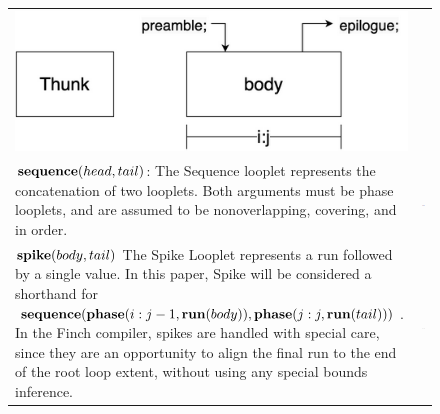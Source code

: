 \begin{figure}[ht]
\begin{tabular} {|l|c|}
    \begin{minipage}[c]{0.35\linewidth}
        \centering
        \includegraphics[scale=0.20]{Looplets-thunk.png}
    \end{minipage} \\
    \begin{minipage}[c]{0.65\linewidth}
        $\text{\textbf{sequence}}(head, tail)$: The Sequence looplet represents the
        concatenation of two looplets. Both arguments must be phase looplets, and
        are assumed to be nonoverlapping, covering, and in order.
    \end{minipage} &
    \begin{minipage}[c]{0.35\linewidth}
        \centering
        \includegraphics[scale=0.20]{Looplets-sequence.png}
    \end{minipage} \\
    \begin{minipage}[c]{0.65\linewidth}
        $\text{\textbf{spike}}(body, tail)$ The Spike Looplet represents a run
        followed by a single value. In this paper, Spike will be considered a
        shorthand for $\text{\textbf{sequence}}(\text{\textbf{phase}}(i:j-1, \text{\textbf{run}}(body)),
        \text{\textbf{phase}}(j:j, \text{\textbf{run}}(tail)))$.  In the Finch compiler, spikes are
        handled with special care, since they are an opportunity to align the
        final run to the end of the root loop extent, without using any special
        bounds inference.
    \end{minipage} &
    \begin{minipage}[c]{0.35\linewidth}
        \centering
        \includegraphics[scale=0.20]{Looplets-spike.png}

\end{minipage}
\end{tabular}
\end{figure}
